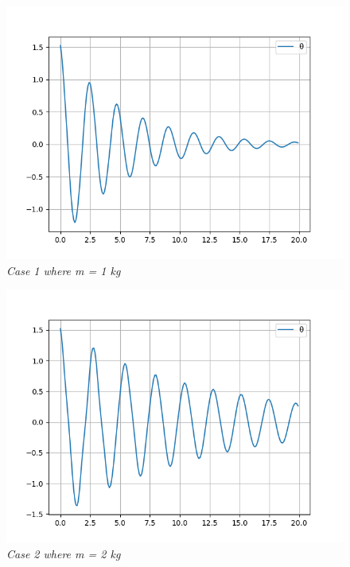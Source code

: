         \begin{figure}[H]
            \centering
            \includegraphics{Appendix/RExpPictures/A/am1.png}
            \caption{\textit{Case 1 where m = 1 kg}}
            \label{}
        \end{figure}
            
        \begin{figure}[H]
            \centering
            \includegraphics{Appendix/RExpPictures/A/am2.png}
            \caption{\textit{Case 2 where m = 2 kg}}
            \label{}
        \end{figure}
            

